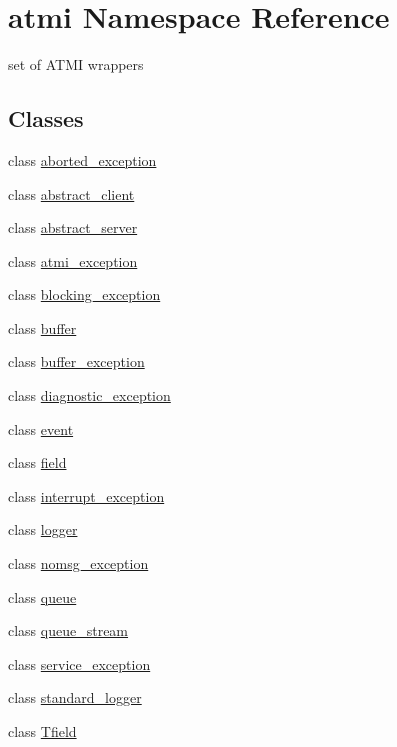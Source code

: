 \hypertarget{namespaceatmi}{\section{atmi Namespace Reference}
\label{namespaceatmi}
}


set of A\+T\+M\+I wrappers  


\subsection*{Classes}
\begin{DoxyCompactItemize}
\item 
class \hyperlink{classatmi_1_1aborted__exception}{aborted\+\_\+exception}
\item 
class \hyperlink{classatmi_1_1abstract__client}{abstract\+\_\+client}
\item 
class \hyperlink{classatmi_1_1abstract__server}{abstract\+\_\+server}
\item 
class \hyperlink{classatmi_1_1atmi__exception}{atmi\+\_\+exception}
\item 
class \hyperlink{classatmi_1_1blocking__exception}{blocking\+\_\+exception}
\item 
class \hyperlink{classatmi_1_1buffer}{buffer}
\item 
class \hyperlink{classatmi_1_1buffer__exception}{buffer\+\_\+exception}
\item 
class \hyperlink{classatmi_1_1diagnostic__exception}{diagnostic\+\_\+exception}
\item 
class \hyperlink{classatmi_1_1event}{event}
\item 
class \hyperlink{classatmi_1_1field}{field}
\item 
class \hyperlink{classatmi_1_1interrupt__exception}{interrupt\+\_\+exception}
\item 
class \hyperlink{classatmi_1_1logger}{logger}
\item 
class \hyperlink{classatmi_1_1nomsg__exception}{nomsg\+\_\+exception}
\item 
class \hyperlink{classatmi_1_1queue}{queue}
\item 
class \hyperlink{classatmi_1_1queue__stream}{queue\+\_\+stream}
\item 
class \hyperlink{classatmi_1_1service__exception}{service\+\_\+exception}
\item 
class \hyperlink{classatmi_1_1standard__logger}{standard\+\_\+logger}
\item 
class \hyperlink{classatmi_1_1_tfield}{Tfield}

\end{DoxyCompactItemize}
